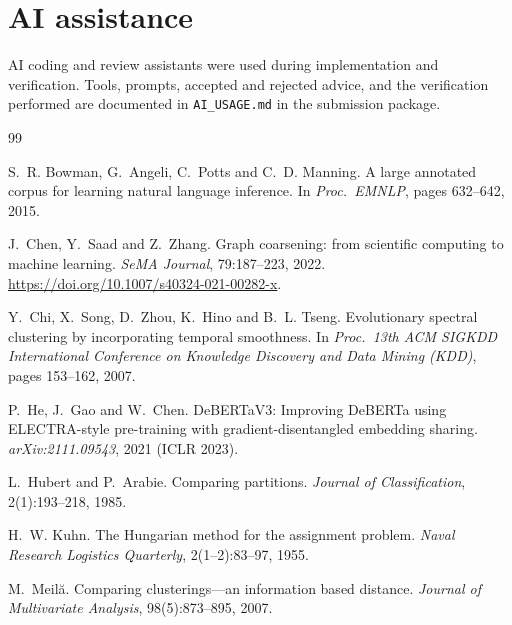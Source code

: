 \documentclass[11pt,a4paper]{article}
\theoremstyle{remark}
\newcommand{\code}[1]{\texttt{\small #1}}
\begin{document}
\section*{AI assistance}
AI coding and review assistants were used during implementation and verification. Tools,
prompts, accepted and rejected advice, and the verification performed are documented in
\code{AI\_USAGE.md} in the submission package.

\clearpage
{}
\begin{thebibliography}{99}
\setlength{\itemsep}{3pt}
\small

S.~R. Bowman, G.~Angeli, C.~Potts and C.~D. Manning.
\newblock A large annotated corpus for learning natural language inference.
\newblock In \emph{Proc.\ EMNLP}, pages 632--642, 2015.

J.~Chen, Y.~Saad and Z.~Zhang.
\newblock Graph coarsening: from scientific computing to machine learning.
\newblock \emph{SeMA Journal}, 79:187--223, 2022.
\newblock \url{https://doi.org/10.1007/s40324-021-00282-x}.

Y.~Chi, X.~Song, D.~Zhou, K.~Hino and B.~L. Tseng.
\newblock Evolutionary spectral clustering by incorporating temporal smoothness.
\newblock In \emph{Proc.\ 13th ACM SIGKDD International Conference on Knowledge Discovery and
Data Mining (KDD)}, pages 153--162, 2007.

P.~He, J.~Gao and W.~Chen.
\newblock DeBERTaV3: Improving DeBERTa using ELECTRA-style pre-training with gradient-disentangled
embedding sharing.
\newblock \emph{arXiv:2111.09543}, 2021 (ICLR 2023).

L.~Hubert and P.~Arabie.
\newblock Comparing partitions.
\newblock \emph{Journal of Classification}, 2(1):193--218, 1985.

H.~W. Kuhn.
\newblock The Hungarian method for the assignment problem.
\newblock \emph{Naval Research Logistics Quarterly}, 2(1--2):83--97, 1955.

M.~Meil\u{a}.
\newblock Comparing clusterings---an information based distance.
\newblock \emph{Journal of Multivariate Analysis}, 98(5):873--895, 2007.


\end{thebibliography}
\end{document}
